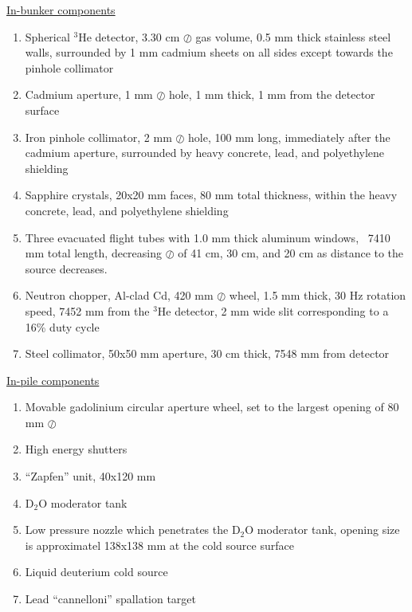 \documentclass[5p,12pt]{elsarticle}
\begin{document}
\begin{center} \underline{In-bunker components}\end{center}
\begin{enumerate}
  \item Spherical $^3$He detector, 3.30 cm $\oslash$ gas volume, 0.5 mm thick stainless steel walls, surrounded by 1 mm cadmium sheets on all sides except towards the pinhole collimator
  \item Cadmium aperture, 1 mm $\oslash$ hole, 1 mm thick, 1 mm from the detector surface
  \item Iron pinhole collimator, 2 mm $\oslash$ hole, 100 mm long, immediately after the cadmium aperture, surrounded by heavy concrete, lead, and polyethylene shielding
  \item Sapphire crystals, 20x20 mm faces, 80 mm total thickness, within the heavy concrete, lead, and polyethylene shielding
  \item Three evacuated flight tubes with 1.0 mm thick aluminum windows, ~7410 mm total length, decreasing $\oslash$ of 41 cm, 30 cm, and 20 cm as distance to the source decreases. 
  \item Neutron chopper, Al-clad Cd, 420 mm $\oslash$ wheel, 1.5 mm thick, 30 Hz rotation speed, 7452 mm from the $^3$He detector, 2 mm wide slit corresponding to a 16\% duty cycle
  \item Steel collimator, 50x50 mm aperture, 30 cm thick, 7548 mm from detector
\end{enumerate}
\begin{center}\underline{In-pile components}\end{center}
\begin{enumerate}[resume]
  \item Movable gadolinium circular aperture wheel, set to the largest opening of 80 mm $\oslash$
  \item High energy shutters
  \item ``Zapfen'' unit, 40x120 mm
  \item D$_2$O moderator tank
  \item Low pressure nozzle which penetrates the D$_2$O moderator tank, opening size is approximatel 138x138 mm at the cold source surface
  \item Liquid deuterium cold source
  \item Lead ``cannelloni'' spallation target
\end{enumerate}
\end{document}
